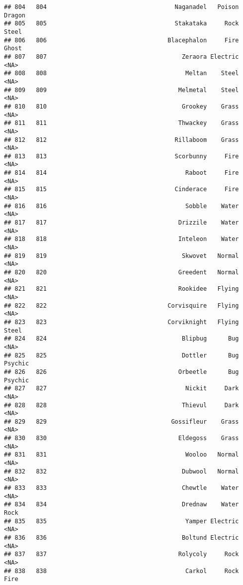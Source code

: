 \documentclass[
]{article}
\begin{document}
\begin{verbatim}
## 804   804                                    Naganadel   Poison   Dragon
## 805   805                                    Stakataka     Rock    Steel
## 806   806                                  Blacephalon     Fire    Ghost
## 807   807                                      Zeraora Electric     <NA>
## 808   808                                       Meltan    Steel     <NA>
## 809   809                                     Melmetal    Steel     <NA>
## 810   810                                      Grookey    Grass     <NA>
## 811   811                                     Thwackey    Grass     <NA>
## 812   812                                    Rillaboom    Grass     <NA>
## 813   813                                    Scorbunny     Fire     <NA>
## 814   814                                       Raboot     Fire     <NA>
## 815   815                                    Cinderace     Fire     <NA>
## 816   816                                       Sobble    Water     <NA>
## 817   817                                     Drizzile    Water     <NA>
## 818   818                                     Inteleon    Water     <NA>
## 819   819                                      Skwovet   Normal     <NA>
## 820   820                                     Greedent   Normal     <NA>
## 821   821                                     Rookidee   Flying     <NA>
## 822   822                                  Corvisquire   Flying     <NA>
## 823   823                                  Corviknight   Flying    Steel
## 824   824                                      Blipbug      Bug     <NA>
## 825   825                                      Dottler      Bug  Psychic
## 826   826                                     Orbeetle      Bug  Psychic
## 827   827                                       Nickit     Dark     <NA>
## 828   828                                      Thievul     Dark     <NA>
## 829   829                                   Gossifleur    Grass     <NA>
## 830   830                                     Eldegoss    Grass     <NA>
## 831   831                                       Wooloo   Normal     <NA>
## 832   832                                      Dubwool   Normal     <NA>
## 833   833                                      Chewtle    Water     <NA>
## 834   834                                      Drednaw    Water     Rock
## 835   835                                       Yamper Electric     <NA>
## 836   836                                      Boltund Electric     <NA>
## 837   837                                     Rolycoly     Rock     <NA>
## 838   838                                       Carkol     Rock     Fire

\end{verbatim}
\end{document}
